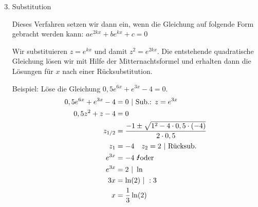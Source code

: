\begin{enumerate}[label=\arabic*)]
	\setcounter{enumi}{2}
	\item Substitution

	Dieses Verfahren setzen wir dann ein, wenn die Gleichung auf folgende Form gebracht werden kann: \(ae^{2kx}+be^{kx}+c=0\)

	Wir substituieren \(z=e^{kx}\) und damit \(z^2=e^{2kx}\). Die entstehende quadratische Gleichung lösen wir mit Hilfe der Mitternachtsformel und erhalten dann die Lösungen für \(x\) nach einer Rücksubstitution.

	Beispiel: Löse die Gleichung \(0,5e^{6x}+e^{3x}-4=0\).
	\textcolor{loes}{\begin{align*}
			0,5e^{6x}+e^{3x}-4&=0\ \vert\ \text{Sub.: }z=e^{3x}\\
			0,5z^2+z-4&=0\\
			z_{1/2}&=\frac{-1\pm\sqrt{1^2-4\cdot 0,5\cdot \left(-4\right)}}{2\cdot 0,5}\\
			z_1&=-4\quad z_2=2\ \vert\ \text{Rücksub.}\\
			e^{3x}&=-4\text{ \Lightning\normalsize oder}\\
			e^{3x}&=2\ \vert\ \ln\\
			3x&=\ln\left(2\right)\ \vert\ :3\\
			x&=\frac{1}{3}\ln\left(2\right)
	\end{align*}}
\end{enumerate}
\newpage
